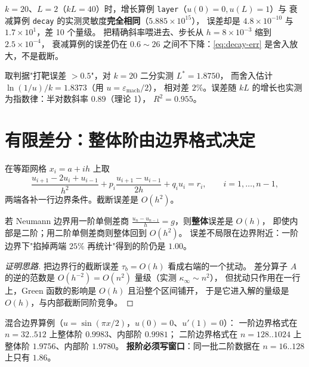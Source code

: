 \begin{remark}
$k=20$、$L=2$（$kL=40$）时，增长算例 \texttt{layer}（$u(0)=0,u(L)=1$）与
衰减算例 \texttt{decay} 的实测灵敏度\textbf{完全相同}（$5.885\times10^{15}$），
误差却是 $4.8\times10^{-10}$ 与 $1.7\times10^{1}$，差 10 个量级。
把精确斜率喂进去、步长从 $h=8\times10^{-3}$ 缩到 $2.5\times10^{-4}$，
衰减算例的误差仍在 $0.6\sim26$ 之间不下降：\eqref{eq:decay-err} 是舍入放大，不是截断。
\end{remark}

\begin{remark}[实测：失效长度的二分阈值]
取判据"打靶误差 $>0.5$"，对 $k=20$ 二分实测 $L^*=1.8750$，
而舍入估计 $\ln(1/u)/k=1.8373$（用 $u=\varepsilon_{\text{mach}}/2$），
相对差 $2\%$。误差随 $kL$ 的增长也实测为指数律：半对数斜率 $0.89$（理论 1），
$R^2=0.955$。
\end{remark}

\section{有限差分：整体阶由边界格式决定}

\begin{theorem}
在等距网格 $x_i=a+ih$ 上取
\begin{equation}
  \frac{u_{i+1}-2u_i+u_{i-1}}{h^2}+p_i\frac{u_{i+1}-u_{i-1}}{2h}+q_iu_i=r_i,
  \qquad i=1,\dots,n-1,
  \label{eq:fd}
\end{equation}
两端各补一行边界条件。截断误差是 $O(h^2)$。
\end{theorem}

\begin{theorem}[边界差商的阶会拖住整体阶]
\label{thm:bc-order}
若 Neumann 边界用一阶单侧差商 $\frac{u_n-u_{n-1}}{h}=g$，则\textbf{整体}误差是 $O(h)$，
即使内部是二阶；用二阶单侧差商则整体回到 $O(h^2)$。
误差不局限在边界附近：一阶边界下"掐掉两端 $25\%$ 再统计"得到的阶仍是 $1.00$。
\end{theorem}
\begin{proof}[证明思路]
把边界行的截断误差 $\tau_b=O(h)$ 看成右端的一个扰动。
差分算子 $A$ 的逆的范数是 $O(h^{-2})=O(n^2)$ 量级（实测 $\kappa_\infty\sim n^2$），
但扰动只作用在一行上，Green 函数的影响是 $O(h)$ 且沿整个区间铺开，
于是它进入解的量级是 $O(h)$，与内部截断同阶竞争。
\end{proof}

\begin{remark}[实测：0.9983 与 1.9756]
混合边界算例（$u=\sin(\pi x/2)$，$u(0)=0$、$u'(1)=0$）：
一阶边界格式在 $n=32..512$ 上整体阶 $0.9983$、内部阶 $0.9981$；
二阶边界格式在 $n=128..1024$ 上整体阶 $1.9756$、内部阶 $1.9780$。
\textbf{报阶必须写窗口}：同一批二阶数据在 $n=16..128$ 上只有 $1.86$。
\end{remark}

